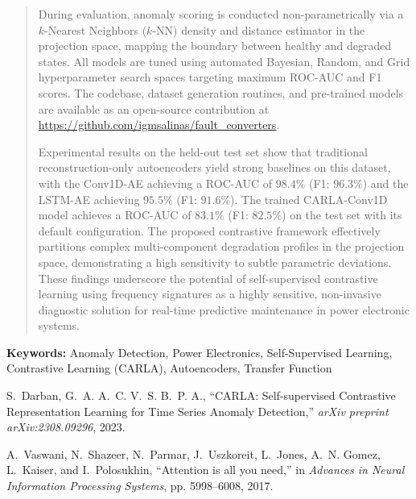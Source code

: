 \documentclass[11pt,a4paper]{article}
\begin{document}
\begin{abstract}
During evaluation, anomaly scoring is conducted non-parametrically via a $k$-Nearest Neighbors ($k$-NN) density and distance estimator in the projection space, mapping the boundary between healthy and degraded states. All models are tuned using automated Bayesian, Random, and Grid hyperparameter search spaces targeting maximum ROC-AUC and F1 scores. The codebase, dataset generation routines, and pre-trained models are available as an open-source contribution at \url{https://github.com/igmsalinas/fault_converters}. 

Experimental results on the held-out test set show that traditional reconstruction-only autoencoders yield strong baselines on this dataset, with the Conv1D-AE achieving a ROC-AUC of $98.4\%$ (F1: $96.3\%$) and the LSTM-AE achieving $95.5\%$ (F1: $91.6\%$). The trained CARLA-Conv1D model achieves a ROC-AUC of $83.1\%$ (F1: $82.5\%$) on the test set with its default configuration. The proposed contrastive framework effectively partitions complex multi-component degradation profiles in the projection space, demonstrating a high sensitivity to subtle parametric deviations. These findings underscore the potential of self-supervised contrastive learning using frequency signatures as a highly sensitive, non-invasive diagnostic solution for real-time predictive maintenance in power electronic systems.
\end{abstract}

\vspace{0.5cm}
\noindent \textbf{Keywords:} Anomaly Detection, Power Electronics, Self-Supervised Learning, Contrastive Learning (CARLA), Autoencoders, Transfer Function


\begin{thebibliography}{1}

S.~Darban, G.~A. A.~C. V.~S. B.~P. A., ``CARLA: Self-supervised Contrastive Representation Learning for Time Series Anomaly Detection,'' \emph{arXiv preprint arXiv:2308.09296}, 2023.

A.~Vaswani, N.~Shazeer, N.~Parmar, J.~Uszkoreit, L.~Jones, A.~N. Gomez, L.~Kaiser, and I.~Polosukhin, ``Attention is all you need,'' in \emph{Advances in Neural Information Processing Systems}, pp. 5998--6008, 2017.

\end{thebibliography}
\end{document}
